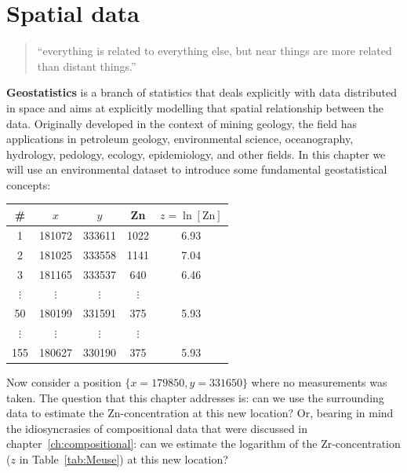 \chapter{Spatial data}
\label{ch:spatial}

\begin{quotation}
``everything is related to everything else, but near things are more
  related than distant things.''  
\end{quotation}

\textbf{Geostatistics} is a branch of statistics that deals explicitly
with data distributed in space and aims at explicitly modelling that
spatial relationship between the data. Originally developed in the
context of mining geology, the field has applications in petroleum
geology, environmental science, oceanography, hydrology, pedology,
ecology, epidemiology, and other fields. In this chapter we will use
an environmental dataset to introduce some fundamental geostatistical
concepts:

\begin{center}
\begin{tabular}{c|cccc}
\#  & $x$    & $y$    & Zn & $z=\ln[\mbox{Zn}]$\\ \hline
1   & 181072 & 333611 & 1022 & 6.93 \\     
2   & 181025 & 333558 & 1141 & 7.04 \\
3   & 181165 & 333537 & 640  & 6.46 \\
$\vdots$ & $\vdots$ & $\vdots$ & $\vdots$ \\
50  & 180199 & 331591 & 375  & 5.93 \\
$\vdots$ & $\vdots$ & $\vdots$ & $\vdots$ \\
155 & 180627 & 330190 & 375  & 5.93 \\
\end{tabular}
\label{tab:Meuse}
\end{center}

Now consider a position $\{x=179850,y=331650\}$ where no measurements
was taken. The question that this chapter addresses is: can we use the
surrounding data to estimate the Zn-concentration at this new
location? Or, bearing in mind the idiosyncrasies of compositional data
that were discussed in chapter~\ref{ch:compositional}: can we estimate
the logarithm of the Zr-concentration ($z$ in Table~\ref{tab:Meuse})
at this new location?

